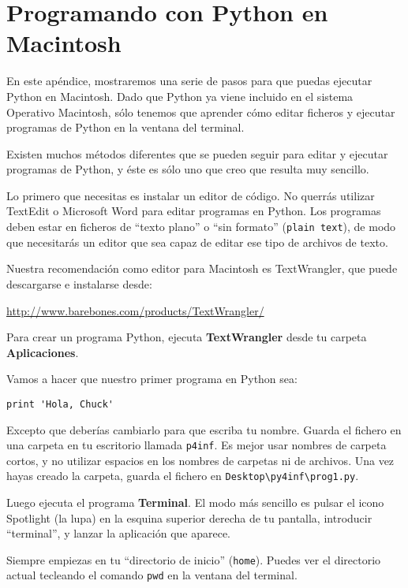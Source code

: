 
\chapter{Programando con Python en Macintosh}

En este apéndice, mostraremos una serie de pasos
para que puedas ejecutar \mbox{Python} en Macintosh. Dado que Python
ya viene incluido en el sistema Operativo Macintosh, sólo
tenemos que aprender cómo editar ficheros y ejecutar programas
de Python en la ventana del terminal.

Existen muchos métodos diferentes que se pueden seguir para editar y ejecutar
programas de Python, y éste es sólo uno que creo que
resulta muy sencillo.

Lo primero que necesitas es instalar un editor de código. No
querrás utilizar \mbox{TextEdit} o Microsoft Word para editar
programas en Python. Los programas deben estar en ficheros de ``texto plano'' o ``sin formato''
({\tt plain text}), de modo que necesitarás un editor que sea capaz de
editar ese tipo de archivos de texto.

Nuestra recomendación como editor para Macintosh es TextWrangler, que
puede descargarse e instalarse desde:

\url{http://www.barebones.com/products/TextWrangler/}

Para crear un programa Python, ejecuta
{\bf TextWrangler} desde tu carpeta {\bf Aplicaciones}.

Vamos a hacer que nuestro primer programa en Python sea:

\beforeverb
\begin{verbatim}
print 'Hola, Chuck'
\end{verbatim}
\afterverb
%
Excepto que deberías cambiarlo para que escriba tu nombre.
Guarda el fichero en una carpeta en tu escritorio llamada
{\tt p4inf}. Es mejor usar nombres de carpeta cortos,
y no utilizar espacios en los nombres de carpetas ni de archivos.
Una vez hayas creado la carpeta, guarda el fichero
en {\tt Desktop{\textbackslash}py4inf{\textbackslash}prog1.py}.

Luego ejecuta el programa {\bf Terminal}. El modo más sencillo es
pulsar el icono Spotlight (la lupa) en la esquina superior
derecha de tu pantalla, introducir ``terminal'', y lanzar la
aplicación que aparece.

Siempre empiezas en tu ``directorio de inicio'' ({\tt home}). Puedes ver el directorio
actual tecleando el comando {\tt pwd} en la ventana del terminal.

